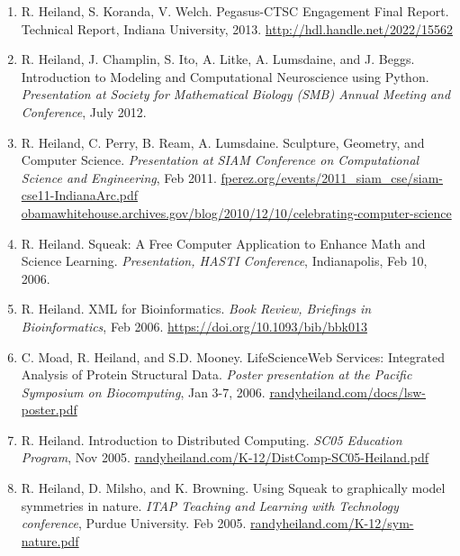 \documentclass[letterpaper,11pt]{article}
\begin{document}
\begin{enumerate}
\item
R. Heiland, S. Koranda, V. Welch.
Pegasus-CTSC Engagement Final Report.
Technical Report, Indiana University, 2013.
\hyperref{http://hdl.handle.net/2022/15562}{}{}{http://hdl.handle.net/2022/15562}
	
	\item
	R. Heiland, J. Champlin, S. Ito, A. Litke, A. Lumsdaine, and J. Beggs.
	Introduction to Modeling and Computational Neuroscience using Python.
	\textit{Presentation at Society for Mathematical Biology (SMB) Annual Meeting and Conference}, July 2012.
	
	\item
	R. Heiland, C. Perry, B. Ream, A. Lumsdaine.
	Sculpture, Geometry, and Computer Science.
	\textit{Presentation at SIAM Conference on Computational Science and Engineering}, Feb 2011.
	\hyperref{http://fperez.org/events/2011_siam_cse/siam-cse11-IndianaArc.pdf}{}{}{fperez.org/events/2011\_siam\_cse/siam-cse11-IndianaArc.pdf}
	\hyperref{https://obamawhitehouse.archives.gov/blog/2010/12/10/celebrating-computer-science}{}{}{obamawhitehouse.archives.gov/blog/2010/12/10/celebrating-computer-science}
	
	\item
	R. Heiland.
	Squeak: A Free Computer Application to Enhance Math and Science Learning.
	\textit{Presentation, HASTI Conference}, Indianapolis, Feb 10, 2006. 
	
	\item
	R. Heiland.
	XML for Bioinformatics.
	\textit{Book Review, Briefings in Bioinformatics}, Feb 2006.
	\hyperref{https://doi.org/10.1093/bib/bbk013}{}{}{https://doi.org/10.1093/bib/bbk013}
	
	\item
	C. Moad, R. Heiland, and S.D. Mooney.
	LifeScienceWeb Services: Integrated Analysis of Protein Structural Data.
	\textit{Poster presentation at the Pacific Symposium on Biocomputing}, Jan 3-7, 2006. 
	\hyperref{http://randyheiland.com/docs/lsw-poster.pdf}{}{}{randyheiland.com/docs/lsw-poster.pdf}
	
	\item
	R. Heiland.
	Introduction to Distributed Computing.
	\textit{SC05 Education Program}, Nov 2005.
	\hyperref{http://randyheiland.com/K-12/DistComp-SC05-Heiland.pdf}{}{}{randyheiland.com/K-12/DistComp-SC05-Heiland.pdf}
	
	\item
	R. Heiland, D. Milsho, and K. Browning.
    Using Squeak to graphically model symmetries in nature.
	\textit{ITAP Teaching and Learning with Technology conference}, Purdue University. Feb 2005.
	\hyperref{http://randyheiland.com/K-12/sym-nature.pdf}{}{}{randyheiland.com/K-12/sym-nature.pdf}
	

\end{enumerate}
\end{document}
